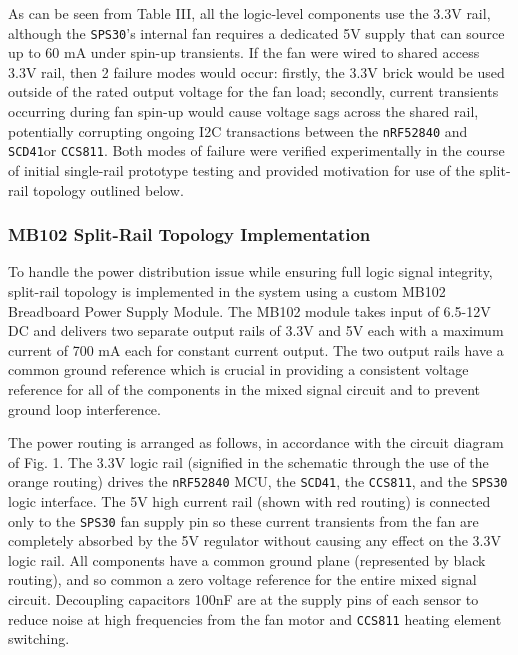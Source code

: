 \documentclass[conference]{IEEEtran}
\begin{document}
As can be seen from Table III, all the logic-level components use the 3.3V rail, although the \texttt{SPS30}'s internal fan requires a dedicated 5V supply that can source up to 60 mA under spin-up transients. If the fan were wired to shared access 3.3V rail, then 2 failure modes would occur: firstly, the 3.3V brick would be used outside of the rated output voltage for the fan load; secondly, current transients occurring during fan spin-up would cause voltage sags across the shared rail, potentially corrupting ongoing I2C transactions between the \texttt{nRF52840} and \texttt{SCD41}or \texttt{CCS811}. Both modes of failure were verified experimentally in the course of initial single-rail prototype testing and provided motivation for use of the split-rail topology outlined below.

\subsubsection{MB102 Split-Rail Topology Implementation}
To handle the power distribution issue while ensuring full logic signal integrity, split-rail topology is implemented in the system using a custom MB102 Breadboard Power Supply Module. The MB102 module takes input of 6.5-12V DC and delivers two separate output rails of 3.3V and 5V each with a maximum current of 700 mA each for constant current output. The two output rails have a common ground reference which is crucial in providing a consistent voltage reference for all of the components in the mixed signal circuit and to prevent ground loop interference.

The power routing is arranged as follows, in accordance with the circuit diagram of Fig. 1. The 3.3V logic rail (signified in the schematic through the use of the orange routing) drives the \texttt{nRF52840} MCU, the \texttt{SCD41}, the \texttt{CCS811}, and the \texttt{SPS30} logic interface. The 5V high current rail (shown with red routing) is connected only to the \texttt{SPS30} fan supply pin so these current transients from the fan are completely absorbed by the 5V regulator without causing any effect on the 3.3V logic rail. All components have a common ground plane (represented by black routing), and so common a zero voltage reference for the entire mixed signal circuit. Decoupling capacitors 100nF are at the supply pins of each sensor to reduce noise at high frequencies from the fan motor and \texttt{CCS811} heating element switching.
\end{document}
